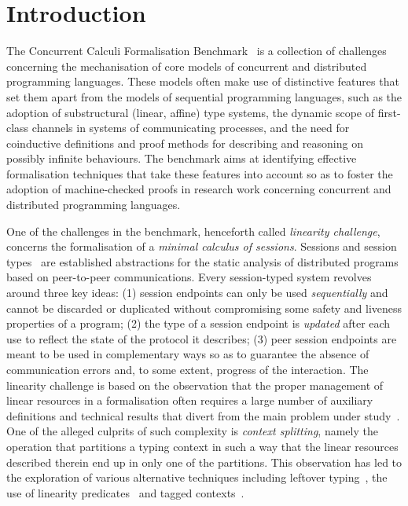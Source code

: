 \section{Introduction}
\label{sec:introduction}

The Concurrent Calculi Formalisation Benchmark~\citep{CarboneEtAl24} is a
collection of challenges concerning the mechanisation of core models of
concurrent and distributed programming languages.
%
These models often make use of distinctive features that set them apart from the
models of sequential programming languages, such as the adoption of
substructural (linear, affine) type systems, the dynamic scope of first-class
channels in systems of communicating processes, and the need for coinductive
definitions and proof methods for describing and reasoning on possibly infinite
behaviours.
%
The benchmark aims at identifying effective formalisation techniques that take
these features into account so as to foster the adoption of machine-checked
proofs in research work concerning concurrent and distributed programming
languages.

One of the challenges in the benchmark, henceforth called \emph{linearity
challenge}, concerns the formalisation of a \emph{minimal calculus of sessions}.
%
Sessions and session
types~\citep{Honda93,HondaVasconcelosKubo98,HuttelEtAl16,GayVasconcelos25} are
established abstractions for the static analysis of distributed programs based
on peer-to-peer communications. Every session-typed system revolves around three
key ideas: (1) session endpoints can only be used \emph{sequentially} and cannot
be discarded or duplicated without compromising some safety and liveness
properties of a program; (2) the type of a session endpoint is \emph{updated}
after each use to reflect the state of the protocol it describes; (3) peer
session endpoints are meant to be used in complementary ways so as to guarantee
the absence of communication errors and, to some extent, progress of the
interaction.
%
The linearity challenge is based on the observation that the proper management
of linear resources in a formalisation often requires a large number of
auxiliary definitions and technical results that divert from the main problem
under study~\cite{CarboneEtAl24}. One of the alleged culprits of such complexity
is \emph{context splitting}, namely the operation that partitions a typing
context in such a way that the linear resources described therein end up in only
one of the partitions. This observation has led to the exploration of various
alternative techniques including leftover typing~\cite{ZalakainDardha21}, the
use of linearity predicates~\cite{SanoKavanaghPientka23} and tagged
contexts~\cite{ZackonEtAl25}.

